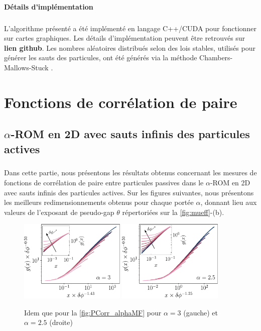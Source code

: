\paragraph{Détails d'implémentation}

\subparagraph{}L'algorithme présenté a été implémenté en langage C++/CUDA pour fonctionner sur cartes graphiques. Les détails d'implémentation peuvent être retrouvés sur \textbf{lien github}. Les nombres aléatoires distribués selon des lois stables, utilisés pour générer les sauts des particules, ont été générés via la méthode Chambers-Mallows-Stuck \cite{chambers_method_1976, weron_chambers_mallows_stuck_1996}.

\section{Fonctions de corrélation de paire}

\label{sec:PCorr}

\subsection{$\alpha$-ROM en 2D avec sauts infinis des particules actives}

\subparagraph{}Dans cette partie, nous présentons les résultats obtenus concernant les mesures de fonctions de corrélation de paire entre particules passives dans le $\alpha$-ROM en 2D avec sauts infinis des particules actives. Sur les figures suivantes, nous présentons les meilleurs redimensionnements obtenus pour chaque portée $\alpha$, donnant lieu aux valeurs de l'exposant de pseudo-gap $\theta$ répertoriées sur la \autoref{fig:mueff}-(b).

\begin{figure}[h]
\centering
\includegraphics[width=0.45\textwidth]{Chapitre3/Figures/Interpretation/PCorrMF/PCorr_rescaled_MF_alpha3.pdf}
\includegraphics[width=0.45\textwidth]{Chapitre3/Figures/Interpretation/PCorrMF/PCorr_rescaled_MF_alpha25.pdf}
\caption{Idem que pour la \autoref{fig:PCorr_alphaMF} pour $\alpha = 3$ (gauche) et $\alpha = 2.5$ (droite)}
\label{fig:PCorrAnnexe1}
\end{figure}

